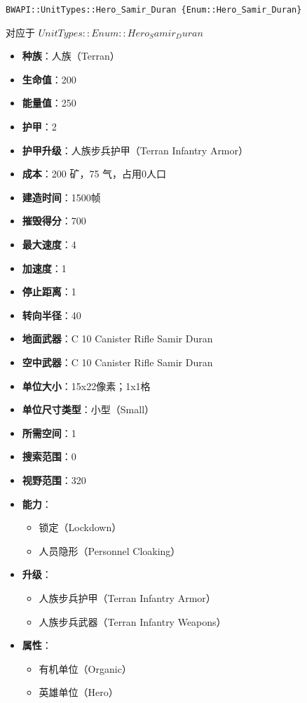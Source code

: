 \begin{tcolorbox}[colback=white, colframe=black!60!white, title=Hero\_Samir\_Duran(), arc=0mm]
    \begin{verbatim}
BWAPI::UnitTypes::Hero_Samir_Duran {Enum::Hero_Samir_Duran}
    \end{verbatim}
    对应于  $ UnitTypes::Enum::Hero_Samir_Duran $ 
    \begin{itemize}
        \item \textbf{种族}：人族（Terran）
        \item \textbf{生命值}：200
        \item \textbf{能量值}：250
        \item \textbf{护甲}：2
        \item \textbf{护甲升级}：人族步兵护甲（Terran Infantry Armor）
        \item \textbf{成本}：200 矿，75 气，占用0人口
        \item \textbf{建造时间}：1500帧
        \item \textbf{摧毁得分}：700
        \item \textbf{最大速度}：4
        \item \textbf{加速度}：1
        \item \textbf{停止距离}：1
        \item \textbf{转向半径}：40
        \item \textbf{地面武器}：C 10 Canister Rifle Samir Duran
        \item \textbf{空中武器}：C 10 Canister Rifle Samir Duran
        \item \textbf{单位大小}：15x22像素；1x1格
        \item \textbf{单位尺寸类型}：小型（Small）
        \item \textbf{所需空间}：1
        \item \textbf{搜索范围}：0
        \item \textbf{视野范围}：320
        \item \textbf{能力}：
            \begin{itemize}
                \item 锁定（Lockdown）
                \item 人员隐形（Personnel Cloaking）
            \end{itemize}
        \item \textbf{升级}：
            \begin{itemize}
                \item 人族步兵护甲（Terran Infantry Armor）
                \item 人族步兵武器（Terran Infantry Weapons）
            \end{itemize}
        \item \textbf{属性}：
            \begin{itemize}
                \item 有机单位（Organic）
                \item 英雄单位（Hero）
            \end{itemize}
    \end{itemize}
    
\end{tcolorbox}

